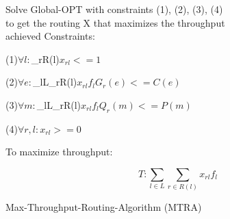 \begin{algorithm}
\SetAlgoLined
Solve Global-OPT with constraints (1), (2), (3), (4) \\
to get the routing X that maximizes the throughput \\
achieved \newline
Constraints:

\hspace{2mm}(1)\hspace{5mm}$\forall l : $\sum_{r\in R(l)}$ x_{rl} <= 1$

\hspace{2mm}(2)\hspace{5mm}$\forall e : $\sum_{l\in L}$ $\sum_{r\in R(l)}$ x_{rl}f_lG_r(e) <= C(e)$

\hspace{2mm}(3)\hspace{5mm}$\forall m : $\sum_{l\in L}$ $\sum_{r\in R(l)}$ x_{rl}f_lQ_r(m) <= P(m)$

\hspace{2mm}(4)\hspace{5mm}$\forall r,l : x_{rl} >= 0$

To maximize throughput: 

$$T : \sum_{l\in L} \sum_{r\in R(l)} x_{rl}f_l$$

\caption{Max-Throughput-Routing-Algorithm (MTRA)}
\end{algorithm}

